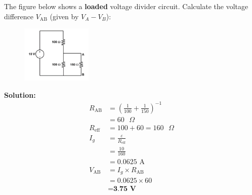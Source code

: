 \documentclass[a4paper, 12pt, addpoints]{exam}
\begin{document}
\begin{questions}

\question The figure below shows a \textbf{loaded} voltage divider circuit. Calculate the voltage difference $V_\text{AB}$ (given by $V_A - V_B$):

\begin{figure}[h!]
    \centering
    \includegraphics[width=0.3\textwidth]{images/Q2.png}
\end{figure}

\begin{tcolorbox}
    \textbf{Solution:}
    \begin{align*}
        R_\text{AB} &= (\frac{1}{100}+\frac{1}{150})^{-1} \\
        &= 60\text{ }\Omega \\
        R_\text{eff} &= 100 + 60 = 160\text{ }\Omega \\
        I_g &= \frac{\varepsilon}{R_\text{eff}} \\
        &= \frac{10}{160} \\
        &= 0.0625\text{ A} \\
        V_\text{AB} &= I_g \times R_\text{AB} \\
        &= 0.0625 \times 60 \\
        &= \textbf{3.75 V}
    \end{align*}
\end{tcolorbox}


\end{questions}
\end{document}
